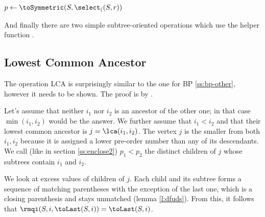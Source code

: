 \begin{algorithm}
\begin{algorithmic}
		\State {}
	\Else
		\State $p \gets \toSymmetric(S, \select_((S, r))$
		\State {}
	\EndIf
\EndFunction
\end{algorithmic}
\end{algorithm}

And finally there are two simple subtree-oriented operations which use the helper function \toLast{}.

\begin{algorithm}
\begin{algorithmic}
		\State {}
	\Else
		\State {}
	\EndIf
\EndFunction
\end{algorithmic}
\end{algorithm}

\begin{algorithm}
\begin{algorithmic}
		\State {}
	\Else
		\State {}
	\EndIf
\EndFunction
\end{algorithmic}
\end{algorithm}

\subsection{Lowest Common Ancestor}

The operation LCA is surprisingly similar to the one for BP \ref{ss:bp-other}, however it needs to be shown.
The proof is by \cite{fischer2010optimal}.

Let's assume that neither $i_1$ nor $i_2$ is an ancestor of the other one; in that case $\min(i_1, i_2)$ would be the answer.
We further assume that $i_1 < i_2$ and that their lowest common ancestor is $j = \lca(i_1, i_2)$.
The vertex $j$ is the smaller from both $i_1, i_2$ because it is assigned a lower pre-order number than any of its descendants.
We call (like in section \ref{ss:enclose2}) $p_1 < p_2$ the distinct children of $j$ whose subtrees contain $i_1$ and $i_2$.

We look at excess values of children of $j$.
Each child and its subtree forms a sequence of matching parentheses with the exception of the last one, which is a closing parenthesis and stays unmatched (lemma \ref{l:dfuds}).
From this, it follows that $\rmqi(S, i, \toLast(S, i)) = \toLast(S, i)$.

